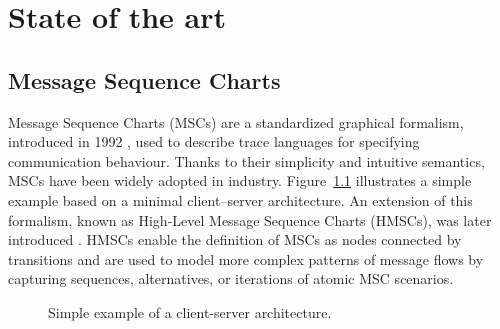 \chapter{State of the art}\label{sec:sota}



\section{Message Sequence Charts}
Message Sequence Charts (MSCs) are a standardized graphical formalism,
introduced in 1992 \cite{MSCStandard}, used to describe trace languages for specifying
communication behaviour. Thanks to their simplicity and intuitive
semantics, MSCs have been widely adopted in industry.
Figure~\ref{fig:msc-cli-ser} illustrates a simple example based on a
minimal client–server architecture. An extension of this formalism,
known as High-Level Message Sequence Charts (HMSCs), was later
introduced \cite{HMSCStandard}. HMSCs enable the definition of
MSCs as nodes connected by transitions and are used to model more
complex patterns of message flows by capturing sequences, alternatives,
or iterations of atomic MSC scenarios.

\begin{figure}[!ht]
\centering
\begin{msc}[draw frame=none, draw head=none, msc keyword=, head height=0px, label distance=0.5ex, foot height=0px, foot distance=0px]{}

	\nextlevel
\end{msc}
\caption{Simple example of a client-server architecture.}
\label{fig:msc-cli-ser}
\end{figure}



